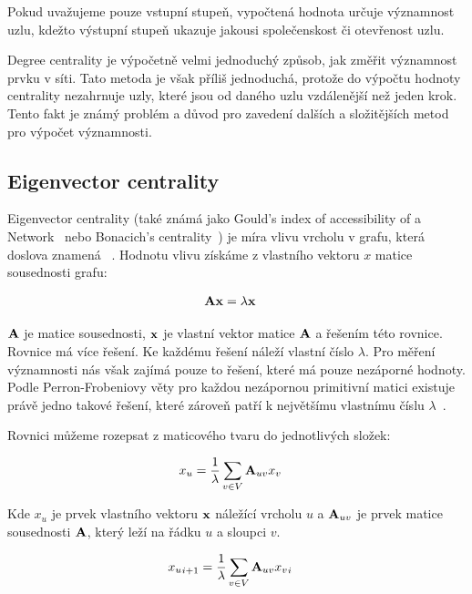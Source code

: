 \documentclass{bakalarka}
\begin{document}
Pokud uvažujeme pouze vstupní stupeň, vypočtená hodnota určuje významnost uzlu,
kdežto výstupní stupeň ukazuje jakousi společenskost či otevřenost uzlu. 

Degree centrality je výpočetně velmi jednoduchý způsob, jak změřit významnost
prvku v síti. Tato metoda je však příliš jednoduchá, protože do výpočtu hodnoty
centrality nezahrnuje uzly, které jsou od daného uzlu vzdálenější než jeden
krok. Tento fakt je známý problém a důvod pro zavedení dalších a složitějších
metod pro výpočet významnosti.



\subsection{Eigenvector centrality}
Eigenvector centrality (také známá jako Gould's index of accessibility of a
Network~\citep{williams2007} nebo Bonacich's
centrality~\citep{hannemanriddle2005}) je míra vlivu vrcholu v grafu, která
doslova znamená ~\citep{zweigiyengar2010}. Hodnotu vlivu získáme z vlastního vektoru
$x$ matice sousednosti grafu:

\begin{align*}
{\bf Ax} &= \lambda {\bf x}
\end{align*}

${\bf A}$ je matice sousednosti, ${\bf x}$ je vlastní vektor matice ${\bf A}$ a
řešením této rovnice. Rovnice má více řešení. Ke každému řešení náleží vlastní
číslo $\lambda$. Pro měření významnosti nás však zajímá pouze to řešení, které
má pouze nezáporné hodnoty. Podle Perron-Frobeniovy věty pro každou nezápornou
primitivní matici existuje právě jedno takové řešení, které zároveň patří k
největšímu vlastnímu číslu $\lambda$~\citep{langvillemeyer}.

Rovnici můžeme rozepsat z maticového tvaru do jednotlivých složek:

\begin{align*} 
x_u &=  \frac{1}{\lambda} \displaystyle\sum_{v \in V} {\bf A}_{uv} x_v 
\end{align*} 

Kde $x_u$ je prvek vlastního vektoru ${\bf x}$
náležící vrcholu $u$ a ${\bf A}_{uv}$ je prvek matice sousednosti ${\bf A}$,
který leží na řádku $u$ a sloupci $v$.

\begin{align*} 
{x_u}_{i + 1} &=  \frac{1}{\lambda} \displaystyle\sum_{v \in V} {\bf A}_{uv}
{x_v}_{i}
\end{align*} 
\end{document}
